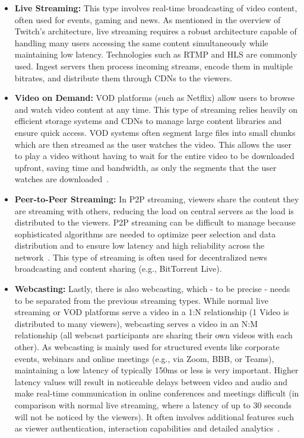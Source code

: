 \begin{itemize}
    \item \textbf{Live Streaming:} This type involves real-time broadcasting of video content, often used for events, gaming and news. As mentioned in the overview of Twitch's architecture, live streaming requires a robust architecture capable of handling many users accessing the same content simultaneously while maintaining low latency. Technologies such as \ac{RTMP} and \ac{HLS} are commonly used. Ingest servers then process incoming streams, encode them in multiple bitrates, and distribute them through \ac{CDN}s to the viewers.
    \item \textbf{Video on Demand:} \ac{VOD} platforms (such as Netflix) allow users to browse and watch video content at any time. This type of streaming relies heavily on efficient storage systems and \ac{CDN}s to manage large content libraries and ensure quick access. \ac{VOD} systems often segment large files into small chunks which are then streamed as the user watches the video. This allows the user to play a video without having to wait for the entire video to be downloaded upfront, saving time and bandwidth, as only the segments that the user watches are downloaded~\parencite{cloud_streaming_trends}.
    \item \textbf{Peer-to-Peer Streaming:} In \ac{P2P} streaming, viewers share the content they are streaming with others, reducing the load on central servers as the load is distributed to the viewers. \ac{P2P} streaming can be difficult to manage because sophisticated algorithms are needed to optimize peer selection and data distribution and to ensure low latency and high reliability across the network~\parencite{p2p}. This type of streaming is often used for decentralized news broadcasting and content sharing (e.g., BitTorrent Live).
    \item \textbf{Webcasting:} Lastly, there is also webcasting, which - to be precise - needs to be separated from the previous streaming types. While normal live streaming or \ac{VOD} platforms serve a video in a 1:N relationship (1 Video is distributed to many viewers), webcasting serves a video in an N:M relationship (all webcast participants are sharing their own videos with each other). As webcasting is mainly used for structured events like corporate events, webinars and online meetings (e.g., via Zoom, BBB, or Teams), maintaining a low latency of typically 150ms or less is very important. Higher latency values will result in noticeable delays between video and audio and make real-time communication in online conferences and meetings difficult (in comparison with normal live streaming, where a latency of up to 30 seconds will not be noticed by the viewers).  
    It often involves additional features such as viewer authentication, interaction capabilities and detailed analytics~\parencite{cloud_streaming_trends}.
\end{itemize}

